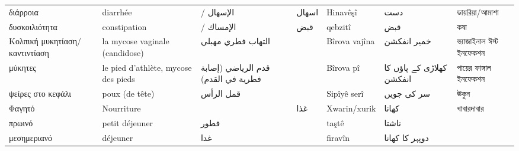 \begin{longtable}{p{3.5cm} p{3.5cm} p{3.5cm} p{3.5cm} p{3.5cm} p{3.5cm} p{3.5cm} }
 διάρροια                               & diarrhée                                            & / الإسهال                            & اسهال                                    & Hinavêşî                                    & دست                               & ডায়রিয়া/আমাশা                           \\
 δυσκοιλιότητα                          & constipation                                        & / الإمساك                            & قبض                                      & qebzitî                                     & قبض                               & কষা                                     \\
 Κολπική μυκητίαση/καντιντίαση          & la mycose vaginale (candidose)                      & التهاب فطري مهبلي                    &                                          & Bîrova vajîna                               & خمیر انفکشن                       & ভ্যাজাইনাল ঈস্ট ইনফেকশন                 \\
 μύκητες                                & le pied d'athlète, mycose des pieds                 & قدم الرياضي (إصابة فطرية في القدم)   &                                          & Bîrova pî                                   & کھلاڑی کے پاؤں کا انفکشن          & পায়ের ফাঙ্গাল ইনফেকশন                   \\
 ψείρες στο κεφάλι                      & poux (de tête)                                      & قمل الرأس                            &                                          & Sipîyê serî                                 & سر کی جویں                        & ঊকুন                                    \\
\midrule
 Φαγητό                                     & Nourriture                                                       &                                  & غذا                 & Xwarin/xurik               & کھانا                                                 & খাবারদাবার                                  \\
\midrule
 πρωινό                                     & petit déjeuner                                                   & فطور                             &                     & taştê                      & ناشتا                                                 &                                             \\
 μεσημεριανό                                & déjeuner                                                         & غدا                              &                     & firavîn                    & دوپہر کا کهانا                                        &                                             \\

\end{longtable}
